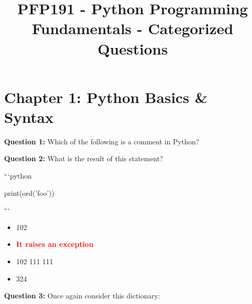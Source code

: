 \documentclass[12pt,a4paper]{article}
\begin{document}
\title{PFP191 - Python Programming Fundamentals - Categorized Questions}
\date{}
\maketitle
\tableofcontents
\newpage

\section{Chapter 1: Python Basics & Syntax}

\textbf{Question 1:} Which of the following is a comment in Python?


\vspace{0.5cm}

\textbf{Question 2:} What is the result of this statement?\newline

\newline
\newline

\newline
```python\newline

\newline
print(ord('foo'))\newline

\newline
```

\begin{itemize}
    \item[\textbf{A.}] 102
    \item[\textbf{B.}] \textcolor{red}{\textbf{It raises an exception}}
    \item[\textbf{C.}] 102 111 111
    \item[\textbf{D.}] 324
\end{itemize}

\vspace{0.5cm}

\textbf{Question 3:} Once again consider this dictionary:\newline
\end{document}
